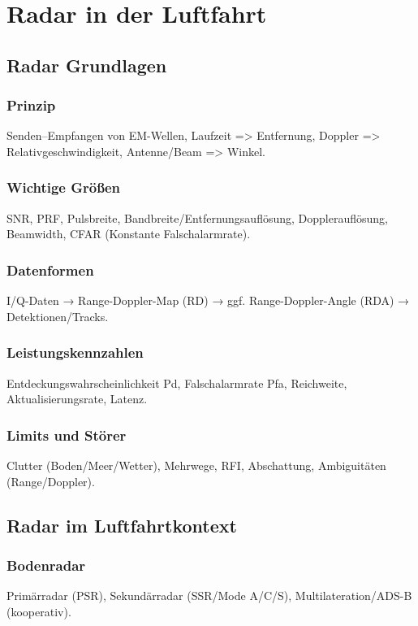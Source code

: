 \part{Radar in der Luftfahrt}
\chapter{Radar Grundlagen}

\section{Prinzip}
Senden–Empfangen von EM-Wellen, 
Laufzeit => Entfernung, 
Doppler => Relativgeschwindigkeit, 
Antenne/Beam => Winkel.

\section{Wichtige Größen}
SNR, PRF, Pulsbreite, 
Bandbreite/Entfernungsauflösung, 
Dopplerauflösung, Beamwidth, 
CFAR (Konstante Falschalarmrate).

\section{Datenformen}
I/Q-Daten → Range-Doppler-Map (RD) → 
ggf. Range-Doppler-Angle (RDA) → Detektionen/Tracks.

\section{Leistungskennzahlen}
Entdeckungswahrscheinlichkeit Pd, Falschalarmrate Pfa, 
Reichweite, Aktualisierungsrate, Latenz.

\section{Limits und Störer}
Clutter (Boden/Meer/Wetter), Mehrwege, RFI, 
Abschattung, Ambiguitäten (Range/Doppler).



\chapter{Radar im Luftfahrtkontext}

\section{Bodenradar}
Primärradar (PSR), 
Sekundärradar (SSR/Mode A/C/S), 
Multilateration/ADS-B (kooperativ).

